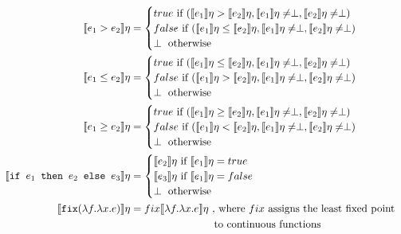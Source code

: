 \begin{align*}
 \\
  \llbracket e_1 > e_2 \rrbracket\eta &= 
 \begin{cases} 
      true \text{ if } (\llbracket e_1 \rrbracket\eta > \llbracket e_2 \rrbracket\eta, \llbracket e_1 \rrbracket\eta \neq \perp, \llbracket e_2 \rrbracket\eta \neq \perp) \\
      false \text{  if } (\llbracket e_1 \rrbracket\eta \leq \llbracket e_2\rrbracket\eta, \llbracket e_1 \rrbracket\eta \neq \perp, \llbracket e_2 \rrbracket\eta \neq \perp)\\
      \perp \text{ otherwise}
   \end{cases}
 \\
  \llbracket e_1 \leq e_2 \rrbracket\eta &= 
 \begin{cases} 
      true \text{ if } (\llbracket e_1 \rrbracket\eta \leq \llbracket e_2 \rrbracket\eta, \llbracket e_1 \rrbracket\eta \neq \perp, \llbracket e_2 \rrbracket\eta \neq \perp) \\
      false \text{  if } (\llbracket e_1 \rrbracket\eta > \llbracket e_2\rrbracket\eta, \llbracket e_1 \rrbracket\eta \neq \perp, \llbracket e_2 \rrbracket\eta \neq \perp)\\
      \perp \text{ otherwise}
   \end{cases}
 \\
  \llbracket e_1 \geq e_2 \rrbracket\eta &= 
 \begin{cases} 
      true \text{ if } (\llbracket e_1 \rrbracket\eta \geq \llbracket e_2 \rrbracket\eta, \llbracket e_1 \rrbracket\eta \neq \perp, \llbracket e_2 \rrbracket\eta \neq \perp) \\
      false \text{  if } (\llbracket e_1 \rrbracket\eta < \llbracket e_2\rrbracket\eta, \llbracket e_1 \rrbracket\eta \neq \perp, \llbracket e_2 \rrbracket\eta \neq \perp)\\
      \perp \text{ otherwise}
   \end{cases}
 \\
  \llbracket \texttt{if } e_1 \texttt{ then } e_2 \texttt{ else } e_3 \rrbracket \eta &= 
 \begin{cases} 
      \llbracket e_2 \rrbracket\eta \text{ if } \llbracket e_1 \rrbracket\eta = true \\
      \llbracket e_3 \rrbracket\eta \text{ if } \llbracket e_1 \rrbracket\eta = false \\
      \perp \text{      otherwise} \\
   \end{cases}
  \\
   \llbracket  \texttt{fix} (\lambda f.\lambda x.e) \rrbracket\eta &= fix\llbracket \lambda f.\lambda x.e \rrbracket\eta \
 \text{, where } fix \text{ assigns the least fixed point} \\ 
 &\text{ \ \ \ \ \ \ \ \ \ \ \ \ \ \ \ \ \ \ \ \ \ \ \ to continuous functions} \\
 \end{align*}

